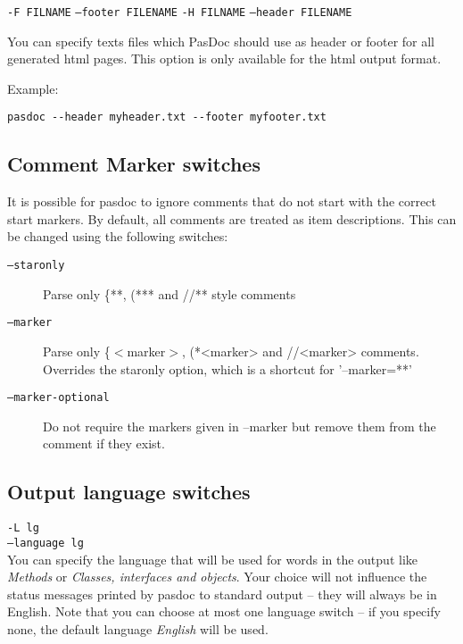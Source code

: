 \documentclass[11pt]{article}
\begin{document}
{\tt -F FILNAME}
{\tt --footer FILENAME}
{\tt -H FILNAME}
{\tt --header FILENAME}

You can specify texts files which PasDoc should use as header or footer 
for all generated html pages. This option is only available for
the html output format.

Example:
\begin{verbatim}
pasdoc --header myheader.txt --footer myfooter.txt
\end{verbatim}



\subsection{Comment Marker switches}
\label{specifymarkers}

It is possible for pasdoc to ignore comments that do not
start with the correct start markers. By default, all
comments are treated as item descriptions. This can
be changed using the following switches:

\begin{description}
\item[{\tt --staronly}] Parse only \{**, (*** and //** style comments
\item[{\tt --marker}] Parse only \{$<$marker$>$, (*<marker> and //<marker> 
comments. Overrides the staronly option, which is a shortcut for 
'--marker=**'
\item[{\tt --marker-optional}] Do not require the markers given in --marker but 
remove them from the comment if they exist.
\end{description}

\subsection{Output language switches}

{\tt -L lg}\\
{\tt --language lg}\\


You can specify the language that will be used for words in the output like
\emph{Methods} or \emph{Classes, interfaces and objects}.
Your choice will not influence the status messages printed by pasdoc to
standard output -- they will always be in English.
Note that you can choose at most one language switch -- if you specify none,
the default language \emph{English} will be used.
\end{document}
